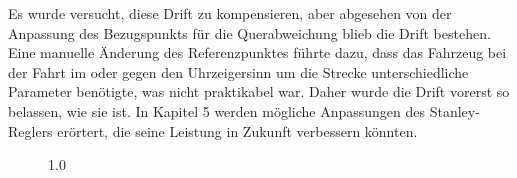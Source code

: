 \documentclass[arbeit=studie,oneside,BCOR=12mm]{ArbeitRST}
\begin{document}
Es wurde versucht, diese Drift zu kompensieren, aber abgesehen von der
Anpassung des Bezugspunkts für die Querabweichung blieb die Drift bestehen.
Eine manuelle Änderung des Referenzpunktes führte dazu, dass das Fahrzeug bei
der Fahrt im oder gegen den Uhrzeigersinn um die Strecke unterschiedliche
Parameter benötigte, was nicht praktikabel war. Daher wurde die Drift vorerst
so belassen, wie sie ist. In Kapitel 5 werden mögliche Anpassungen des
Stanley-Reglers erörtert, die seine Leistung in Zukunft verbessern könnten.

\begin{figure}[h]
    \centering
    \caption{1.0}
    \label{ab:1.0}
\end{figure}
\end{document}
